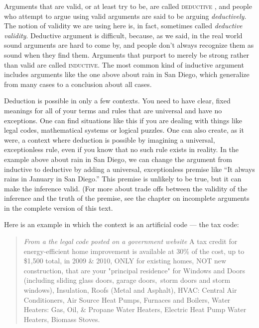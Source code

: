 Arguments that are valid, or at least try to be, are called \textsc{\gls{deductive}} \label{def:deductive}, and people who attempt to argue using valid arguments are said to be arguing \textit{deductively.} The notion of validity we are using here is, in fact, sometimes called \textit{deductive validity}. Deductive argument is difficult, because, as we said, in the real world sound arguments are hard to come by, and people don't always recognize them as sound when they find them. Arguments that purport to merely be strong rather than valid are called \textsc{\gls{inductive}}. \label{def:inductive} The most common kind of inductive argument includes arguments like the one above about rain in San Diego, which generalize from many cases to a conclusion about all cases.

Deduction is possible in only a few contexts. You need to have clear, fixed meanings for all of your terms and rules that are universal and have no exceptions.   One can find situations like this if you are dealing with things like legal codes, mathematical systems or logical puzzles. One can also create, as it were, a context where deduction is possible by imagining a universal, exceptionless rule, even if you know that no such rule exists in reality. In the example above about rain in San Diego, we can change the argument from inductive to deductive by adding a universal, exceptionless premise like ``It always rains in January in San Diego.'' This premise is unlikely to be true, but it can make the inference valid. (For more about trade offs between the validity of the inference and the truth of the premise, see the chapter on incomplete arguments in the complete version of this text. \label{ver_var} 

Here is an example in which the context is an artificial code --- the tax code: 

\begin{quotation} \noindent\textit{From a the legal code posted on a government website} A tax credit for energy-efficient home improvement is available at 30\% of the cost, up to \$1,500 total, in 2009 \& 2010, ONLY for existing homes, NOT new construction, that are your "principal residence" for Windows and Doors (including sliding glass doors, garage doors,~storm doors and storm windows), Insulation, Roofs (Metal and Asphalt), HVAC: Central Air Conditioners, Air Source Heat Pumps, Furnaces and Boilers, Water Heaters: Gas, Oil, \& Propane Water Heaters, Electric Heat Pump Water Heaters, Biomass Stoves. \end{quotation}

